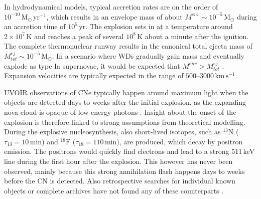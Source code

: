 \documentclass{aa}
\newcommand{\mrm}[1]{\mathrm{#1}}
\newcommand{\nuc}[2]{$\mrm{^{#2}#1}$}
\begin{document}
In hydrodynamical models, typical accretion rates are on the order of $10^{-10}\,\mrm{M_{\odot}\,yr^{-1}}$, which results in an envelope mass of about $M^{env} \sim 10^{-5}\,\mrm{M_{\odot}}$ during an accretion time of $10^5\,\mrm{yr}$.
%
The explosion sets in at a temperature around $2 \times 10^7\,\mrm{K}$ and reaches a peak of several $10^{8}\,\mrm{K}$ about a minute after the ignition.
%
The complete thermonuclear runway results in the canonical total ejecta mass of $M_{tot}^{ej} \sim 10^{-5}\,\mrm{M_{\odot}}$.
%
In a scenario where WDs gradually gain mass and eventually explode as type Ia supernovae, it would be expected that $M^{env} > M^{ej}_{tot}$ \citep{Starrfield2020_COnovae}.
%
Expansion velocities are typically expected in the range of $500$--$3000\,\mrm{km\,s^{-1}}$.

UVOIR observations of CNe typically happen around maximum light when the objects are detected days to weeks after the initial explosion, as the expanding nova cloud is opaque of low-energy photons \citep{Gomez-Gomar1998_novae}.
%
Insight about the onset of the explosion is therefore linked to strong assumptions from theoretical modelling.
%
During the explosive nucleosynthesis, also short-lived isotopes, such as \nuc{N}{13} ($\tau_{13} = 10\,\mrm{min}$) and \nuc{F}{18} ($\tau_{18} = 110\,\mrm{min}$), are produced, which decay by positron emission.
%
The positrons would quickly find electrons and lead to a strong 511\,keV line during the first hour after the explosion.
%
This however has never been observed, mainly because this strong annihilation flash happens days to weeks before the CN is detected.
%
Also retrospective searches for individual known objects or complete archives have not found any of these counterparts \citep{Skinner2008_nova511_retrospective}.
\end{document}
